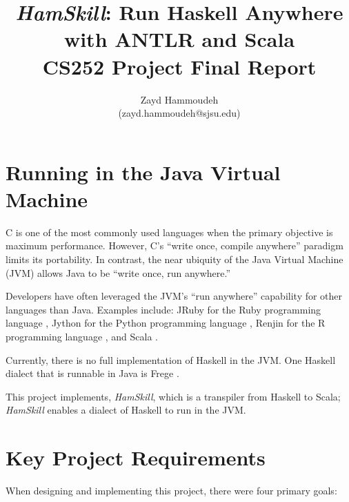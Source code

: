 \documentclass{report}
\title{\emph{HamSkill}: Run Haskell Anywhere \\
with ANTLR and Scala\\[1in]
	   CS252 Project Final Report}
\author{
  Zayd Hammoudeh \\
  (zayd.hammoudeh@sjsu.edu)
  }
\begin{document}
\maketitle


\tableofcontents{\protect\newpage}

\listoffigures
\newpage
 

\renewcommand\thesection{\arabic{section}}

\section{Running in the Java Virtual Machine}\label{sec:jvm}

C is one of the most commonly used languages when the primary objective is maximum performance.  However, C's ``write once, compile anywhere'' paradigm limits its portability.  In contrast, the near ubiquity of the Java Virtual Machine (JVM) allows Java to be ``write once, run anywhere.''  

Developers have often leveraged the JVM's ``run anywhere'' capability for other languages than Java.  Examples include: JRuby for the Ruby programming language \cite{jruby}, Jython for the Python programming language \cite{jython_jvm}, Renjin for the R programming language \cite{renjin}, and Scala \cite{scala}.

Currently, there is no full implementation of Haskell in the JVM.  One Haskell dialect that is runnable in Java is Frege \cite{frege}.  

This project implements, \emph{HamSkill}, which is a transpiler from Haskell to Scala; \textit{HamSkill} enables a dialect of Haskell to run in the JVM.  

\section{Key Project Requirements}\label{sec:keyProjectRequirements}

When designing and implementing this project, there were four primary goals:
\end{document}
